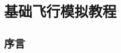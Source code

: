 \newcommand{\weblong}[2]{\href{#1}{#2}} %
\newcommand {\excl}[1]{
    \begin{tabular}{r p{0.75\textwidth}}
    \hspace*{5mm}\LARGE{\textcolor{green}{$!$
}} & #1\\
\end{tabular}
}
\newcommand {\photo}[3]
{\begin{center}
  \texttt{[image: img/\#3]}
\end{center}}

\ifchinese
\chapter{{\\}基础飞行模拟教程}
\fi

{}
\label{basic}

\ifchinese
\section{序言}
\fi

{}
\label{sec:Foreword}

